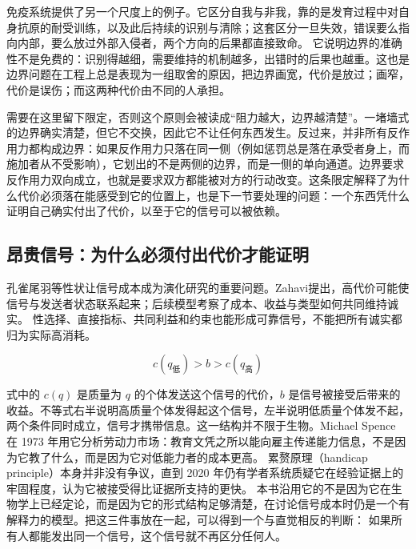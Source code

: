 免疫系统提供了另一个尺度上的例子。它区分自我与非我，靠的是发育过程中对自身抗原的耐受训练，以及此后持续的识别与清除；这套区分一旦失效，错误要么指向内部，要么放过外部入侵者，两个方向的后果都直接致命。\cite{burnet1959clonal} 它说明边界的准确性不是免费的：识别得越细，需要维持的机制越多，出错时的后果也越重。这也是边界问题在工程上总是表现为一组取舍的原因，把边界画宽，代价是放过；画窄，代价是误伤；而这两种代价由不同的人承担。


需要在这里留下限定，否则这个原则会被读成“阻力越大，边界越清楚”。一堵墙式的边界确实清楚，但它不交换，因此它不让任何东西发生。反过来，并非所有反作用力都构成边界：如果反作用力只落在同一侧（例如惩罚总是落在承受者身上，而施加者从不受影响），它划出的不是两侧的边界，而是一侧的单向通道。边界要求反作用力双向成立，也就是要求双方都能被对方的行动改变。这条限定解释了为什么代价必须落在能感受到它的位置上，也是下一节要处理的问题：一个东西凭什么证明自己确实付出了代价，以至于它的信号可以被依赖。

\subsection{昂贵信号：为什么必须付出代价才能证明}


孔雀尾羽等性状让信号成本成为演化研究的重要问题。Zahavi提出，高代价可能使信号与发送者状态联系起来；后续模型考察了成本、收益与类型如何共同维持诚实。\cite{zahavi1975mate,grafen1990biological} 性选择、直接指标、共同利益和约束也能形成可靠信号，不能把所有诚实都归为实际高消耗。

\begin{equation}
c(q_{\text{低}}) > b > c(q_{\text{高}})
\end{equation}

式中的 $c(q)$ 是质量为 $q$ 的个体发送这个信号的代价，$b$ 是信号被接受后带来的收益。不等式右半说明高质量个体发得起这个信号，左半说明低质量个体发不起，两个条件同时成立，信号才携带信息。这一结构并不限于生物。Michael Spence 在 1973 年用它分析劳动力市场：教育文凭之所以能向雇主传递能力信息，不是因为它教了什么，而是因为它对低能力者的成本更高。\cite{spence1973job} 累赘原理（handicap principle）本身并非没有争议，直到 2020 年仍有学者系统质疑它在经验证据上的牢固程度，认为它被接受得比证据所支持的更快。\cite{penn2020handicap} 本书沿用它的不是因为它在生物学上已经定论，而是因为它的形式结构足够清楚，在讨论信号成本时仍是一个有解释力的模型。把这三件事放在一起，可以得到一个与直觉相反的判断： 如果所有人都能发出同一个信号，这个信号就不再区分任何人。

